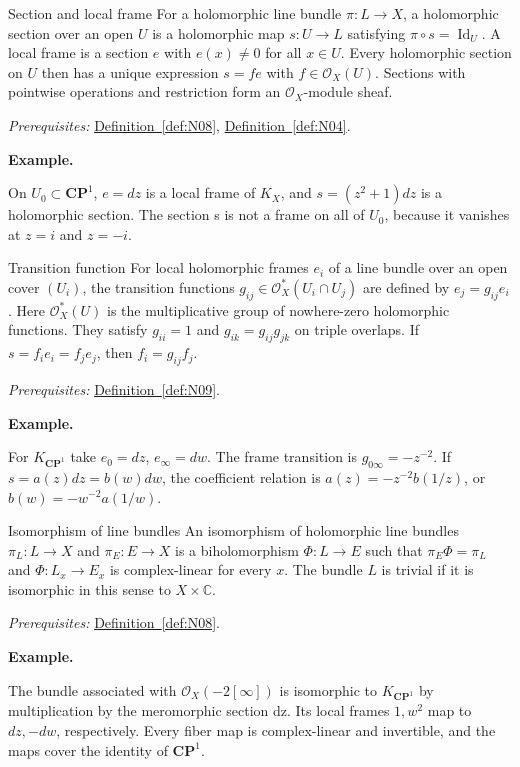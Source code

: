 \documentclass[11pt]{article}
\makeatletter
\newcommand{\C}{\mathbb C}
\newcommand{\id}{\operatorname{Id}}
\newcounter{definition}
\newcommand{\CP}{\mathbf{CP}}
\newcommand{\exampleheading}{\par\medskip\textbf{Example.}\par\smallskip}
\newcommand{\currentdefinition}[1]{\protected@edef\@currentlabel{#1}}
\makeatother
\begin{document}
\begin{definitionbox}{Section and local frame}
\currentdefinition{\thedefinition}
\label{def:N09}
For a holomorphic line bundle $\pi:L\to X$, a holomorphic section over an open $U$ is a holomorphic map $s:U\to L$ satisfying $\pi\circ s=\id_U$. A local frame is a section $e$ with $e(x)\ne0$ for all $x\in U$. Every holomorphic section on $U$ then has a unique expression $s=fe$ with $f\in\mathcal O_X(U)$. Sections with pointwise operations and restriction form an $\mathcal O_X$-module sheaf.

\smallskip
\textit{Prerequisites:} \hyperref[def:N08]{Definition~\ref*{def:N08}}, \hyperref[def:N04]{Definition~\ref*{def:N04}}.

\exampleheading
On $U_0\subset\CP^1$, $e=dz$ is a local frame of $K_X$, and $s=(z^2+1)dz$ is a holomorphic section. The section s is not a frame on all of $U_0$, because it vanishes at $z=i$ and $z=-i$.
\end{definitionbox}

\begin{definitionbox}{Transition function}
\currentdefinition{\thedefinition}
\label{def:N10}
For local holomorphic frames $e_i$ of a line bundle over an open cover $(U_i)$, the transition functions $g_{ij}\in\mathcal O_X^*(U_i\cap U_j)$ are defined by $e_j=g_{ij}e_i$. Here $\mathcal O_X^*(U)$ is the multiplicative group of nowhere-zero holomorphic functions. They satisfy $g_{ii}=1$ and $g_{ik}=g_{ij}g_{jk}$ on triple overlaps. If $s=f_ie_i=f_je_j$, then $f_i=g_{ij}f_j$.

\smallskip
\textit{Prerequisites:} \hyperref[def:N09]{Definition~\ref*{def:N09}}.

\exampleheading
For $K_{\CP^1}$ take $e_0=dz$, $e_\infty=dw$. The frame transition is $g_{0\infty}=-z^{-2}$. If $s=a(z)dz=b(w)dw$, the coefficient relation is $a(z)=-z^{-2}b(1/z)$, or $b(w)=-w^{-2}a(1/w)$.
\end{definitionbox}

\begin{definitionbox}{Isomorphism of line bundles}
\currentdefinition{\thedefinition}
\label{def:N11}
An isomorphism of holomorphic line bundles $\pi_L:L\to X$ and $\pi_E:E\to X$ is a biholomorphism $\Phi:L\to E$ such that $\pi_E\Phi=\pi_L$ and $\Phi:L_x\to E_x$ is complex-linear for every $x$. The bundle $L$ is trivial if it is isomorphic in this sense to $X\times\C$.

\smallskip
\textit{Prerequisites:} \hyperref[def:N08]{Definition~\ref*{def:N08}}.

\exampleheading
The bundle associated with $\mathcal O_X(-2[\infty])$ is isomorphic to $K_{\CP^1}$ by multiplication by the meromorphic section dz. Its local frames $1,w^2$ map to $dz,-dw$, respectively. Every fiber map is complex-linear and invertible, and the maps cover the identity of $\CP^1$.
\end{definitionbox}
\end{document}
